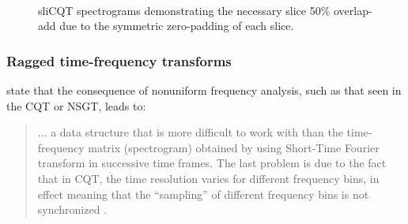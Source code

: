 \documentclass[report.tex]{subfiles}
\begin{document}
\begin{figure}[ht]
	\centering
	\\
	\caption{sliCQT spectrograms demonstrating the necessary slice 50\% overlap-add due to the symmetric zero-padding of each slice.}
	\label{fig:slicqoverlaps}
\end{figure}

\subsubsection{Ragged time-frequency transforms}
\label{sec:raggedtf}

\citeauthor{klapuricqt} state that the consequence of nonuniform frequency analysis, such as that seen in the CQT or NSGT, leads to:
\begin{quote}
	... a data structure that is more difficult to work with than the time-frequency matrix (spectrogram) obtained by using Short-Time Fourier transform in successive time frames. The last problem is due to the fact that in CQT, the time resolution varies for different frequency bins, in effect meaning that the ``sampling'' of different frequency bins is not synchronized \parencite[1]{klapuricqt}.
\end{quote}
\end{document}
